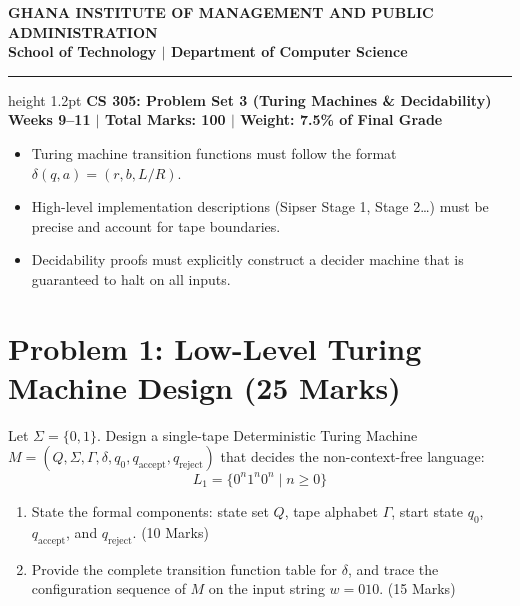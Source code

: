 \documentclass[11pt,a4paper]{article}
\begin{document}
\begin{center}
    {\Large \textbf{\color{gimpanavy}GHANA INSTITUTE OF MANAGEMENT AND PUBLIC ADMINISTRATION}}\\
    {\large \textbf{\color{gimpaaccent}School of Technology $|$ Department of Computer Science}}\\
    \vspace{4pt}
    \hrule height 1.2pt \color{gimpanavy}
    \vspace{6pt}
    {\LARGE \textbf{\color{gimpanavy}CS 305: Problem Set 3 (Turing Machines \& Decidability)}}\\
    {\large \textbf{Weeks 9--11 $|$ Total Marks: 100 $|$ Weight: 7.5\% of Final Grade}}
\end{center}

\vspace{6pt}

\begin{tcolorbox}[colback=gimpalight, colframe=gimpanavy, title=\textbf{Instructions \& Guidelines}]
\begin{itemize}[leftmargin=1.2em, itemsep=2pt]
    \item Turing machine transition functions must follow the format $\delta(q, a) = (r, b, L/R)$.
    \item High-level implementation descriptions (Sipser Stage 1, Stage 2\dots) must be precise and account for tape boundaries.
    \item Decidability proofs must explicitly construct a decider machine that is guaranteed to halt on all inputs.
\end{itemize}
\end{tcolorbox}

\vspace{8pt}

\section*{Problem 1: Low-Level Turing Machine Design (25 Marks)}
Let $\Sigma = \{0, 1\}$. Design a single-tape Deterministic Turing Machine $M = (Q, \Sigma, \Gamma, \delta, q_0, q_{\text{accept}}, q_{\text{reject}})$ that decides the non-context-free language:
$$L_1 = \{0^n 1^n 0^n \mid n \ge 0\}$$
\begin{enumerate}[label=\textbf{(\alph*)}]
    \item State the formal components: state set $Q$, tape alphabet $\Gamma$, start state $q_0$, $q_{\text{accept}}$, and $q_{\text{reject}}$. (10 Marks)
    \item Provide the complete transition function table for $\delta$, and trace the configuration sequence of $M$ on the input string $w = 010$. (15 Marks)
\end{enumerate}
\end{document}
